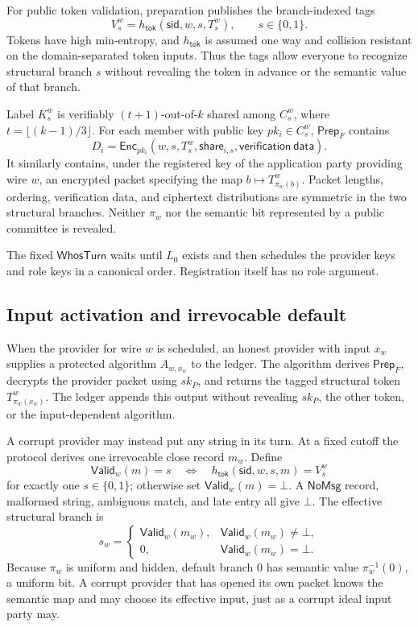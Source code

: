 For public token validation, preparation publishes the branch-indexed tags
\[
  V^w_s=h_{\mathsf{tok}}(\mathsf{sid},w,s,T^w_s),
  \qquad s\in\{0,1\}.
  \label{eq:token-tags}
\]
Tokens have high min-entropy, and $h_{\mathsf{tok}}$ is assumed one way and
collision resistant on the domain-separated token inputs.  Thus the tags
allow everyone to recognize structural branch $s$ without revealing the
token in advance or the semantic value of that branch.

Label $K^w_s$ is verifiably $(t+1)$-out-of-$k$ shared among $C^w_s$, where
$t=\lfloor(k-1)/3\rfloor$.  For each member with public key $pk_i\in C^w_s$,
$\mathsf{Prep}_F$ contains
\[
  D_i=\mathsf{Enc}_{pk_i}
      (w,s,T^w_s,\mathsf{share}_{i,s},
       \mathsf{verification\ data}).
  \label{eq:finite-role-packet}
\]
It similarly contains, under the registered key of the application party
providing wire $w$, an encrypted packet specifying the map
$b\mapsto T^w_{\pi_w(b)}$.  Packet lengths, ordering, verification data, and
ciphertext distributions are symmetric in the two structural branches.
Neither $\pi_w$ nor the semantic bit represented by a public committee is
revealed.

The fixed $\mathsf{WhosTurn}$ waits until $L_0$ exists and then schedules the
provider keys and role keys in a canonical order.  Registration itself has no
role argument.

\subsection{Input activation and irrevocable default}

When the provider for wire $w$ is scheduled, an honest provider with input
$x_w$ supplies a protected algorithm $A_{w,x_w}$ to the ledger.  The
algorithm derives $\mathsf{Prep}_F$, decrypts the provider packet using
$sk_P$, and returns the tagged structural token $T^w_{\pi_w(x_w)}$.  The
ledger appends this output without revealing $sk_P$, the other token, or the
input-dependent algorithm.

A corrupt provider may instead put any string in its turn.  At a fixed cutoff
the protocol derives one irrevocable close record $m_w$.  Define
\[
  \mathsf{Valid}_w(m)=s
  \quad\Longleftrightarrow\quad
  h_{\mathsf{tok}}(\mathsf{sid},w,s,m)=V^w_s
\]
for exactly one $s\in\{0,1\}$; otherwise set
$\mathsf{Valid}_w(m)=\bot$.  A $\mathsf{NoMsg}$ record, malformed string,
ambiguous match, and late entry all give $\bot$.  The effective structural
branch is
\[
  s_w=\begin{cases}
       \mathsf{Valid}_w(m_w),&\mathsf{Valid}_w(m_w)\neq\bot,\\
       0,&\mathsf{Valid}_w(m_w)=\bot.
      \end{cases}
  \label{eq:finite-default}
\]
Because $\pi_w$ is uniform and hidden, default branch $0$ has semantic value
$\pi_w^{-1}(0)$, a uniform bit.  A corrupt provider that has opened its own
packet knows the semantic map and may choose its effective input, just as a
corrupt ideal input party may.

